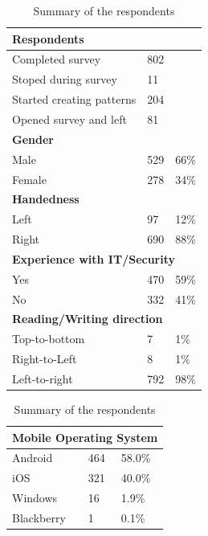     \begin{table}[H]
      \parbox{.45\linewidth}{
        \centering
        \begin{tabular}{ l | l l }
          \hline
          \multicolumn{3}{l}{\bf Respondents} \\ \hline
          Completed survey & 802 \\
          Stoped during survey & 11 \\
          Started creating patterns & 204 \\
          Opened survey and left & 81 \\ \hline
            
          \multicolumn{3}{l}{\bf Gender} \\ \hline
          Male & 529 & 66\% \\
          Female & 278 & 34\% \\ \hline

          \multicolumn{3}{l}{\bf Handedness} \\ \hline
          Left & 97 & 12\% \\
          Right & 690 & 88\% \\ \hline

          \multicolumn{3}{l}{\bf Experience with IT/Security} \\ \hline
          Yes & 470 & 59\% \\
          No & 332 & 41\% \\ \hline

          \multicolumn{2}{l}{\bf Reading/Writing direction} \\ \hline
          Top-to-bottom & 7 & 1\% \\
          Right-to-Left & 8 & 1\% \\
          Left-to-right & 792 & 98\% \\ \hline
        \end{tabular}
        \caption{Summary of the respondents}
        \label{tab:respondentsBasics}
      }
      \hfill
      \parbox{.45\linewidth}{
        \centering
        \begin{tabular}{ l | l l }
          \hline
          \multicolumn{3}{l}{\bf Mobile Operating System} \\ \hline
          Android & 464 & 58.0\% \\
          iOS & 321 & 40.0\% \\
          Windows & 16 & 1.9\% \\
          Blackberry & 1 & 0.1\% \\ \hline
 

\end{tabular}}
\end{table}
